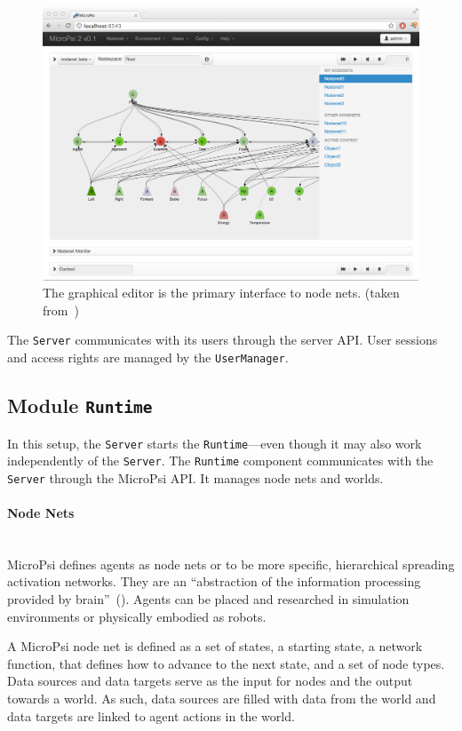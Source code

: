 \begin{figure}[h]
  \centering
    \includegraphics[width=13cm]{graphics/micropsi2_nodenet}
  \caption[The graphical node net editor]{The graphical editor is the primary interface to node nets. (taken from~\cite{conf/agi/Bach12})}
  \label{micropsi2_nodenet}
\end{figure}

The \texttt{Server} communicates with its users through the server API. User sessions and access rights are managed by the \texttt{UserManager}.
   
        \subsection{Module \texttt{Runtime}}
In this setup, the \texttt{Server} starts the \texttt{Runtime}---even though it may also work independently of the \texttt{Server}. The \texttt{Runtime} component communicates with the \texttt{Server} through the MicroPsi API. It manages node nets and worlds.

        \paragraph{Node Nets}$\;$ \\
MicroPsi defines agents as node nets or to be more specific, hierarchical spreading activation networks. They are an ``abstraction of the information processing provided by brain''~(\cite{conf/agi/Bach12}). Agents can be placed and researched in simulation environments or physically embodied as robots. 
  
A MicroPsi node net is defined as a set of states, a starting state, a network function, that defines how to advance to the next state, and a set of node types. Data sources and data targets serve as the input for nodes and the output towards a world. As such, data sources are filled with data from the world and data targets are linked to agent actions in the world.

